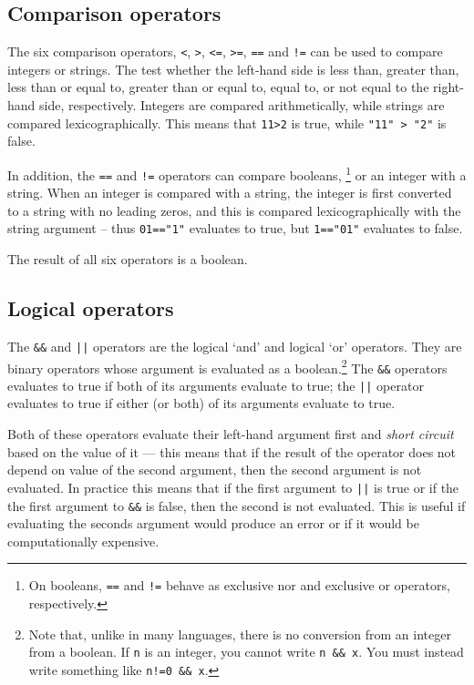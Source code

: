 \documentclass[a4paper,11pt,oneside]{book}
\begin{document}
\subsection{Comparison operators}\label{cmpop}

The six comparison operators,
\verb+<+, \verb+>+, \verb+<=+, \verb+>=+, \verb+==+ and \verb+!=+ 
can be used to compare integers or strings.  The test whether the left-hand
side is less than, greater than, less than or equal to, greater than or equal
to, equal to, or not equal to the right-hand side, respectively.  Integers are
compared arithmetically, while strings are
compared lexicographically.  This means that
\verb+11>2+ is true, while \verb+"11" > "2"+ is false.

In addition, the \verb+==+ and \verb+!=+ operators can compare booleans,%
\footnote{On booleans, \verb+==+ and \verb+!=+ behave as exclusive nor and
exclusive or operators, respectively.%
} 
or an integer with a string.  When an integer is compared with a string, the
integer is first converted to a string with no leading zeros, and this is
compared lexicographically with the string argument -- thus \verb+01=="1"+
evaluates to true, but \verb+1=="01"+ evaluates to false.

The result of all six operators is a boolean.

\subsection{Logical operators}\label{logop}

The \verb+&&+ and \verb+||+ operators are the logical `and' and logical `or'
operators.  They are binary operators
whose argument is evaluated as a boolean.\footnote{Note that, unlike in many
languages, there is no conversion from an integer from a boolean.  If \verb+n+
is an integer, you cannot write \verb+n && x+.  You must instead write
something like \verb+n!=0 && x+.}
The \verb+&&+ operators evaluates to true if both of its arguments evaluate to
true; the \verb+||+ operator evaluates to true if either (or both) of its
arguments evaluate to true.  

Both of these operators evaluate their left-hand argument first and 
\textit{short circuit} 
based on the value of it --- this means that if
the result of the operator does not depend on value of the second argument,
then the second argument is not evaluated.  In practice this means that if
the first argument to \verb+||+ is true or if the 
the first argument to \verb+&&+ is false, then the second is not evaluated.
This is useful if evaluating the seconds argument would produce an error or
if it would be computationally expensive.
\end{document}

